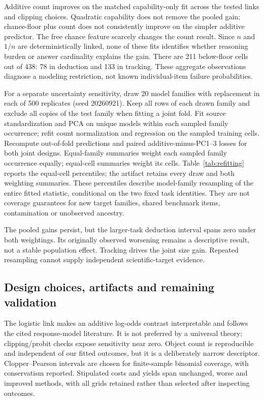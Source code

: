Additive count improves on the matched capability-only fit across the tested links and clipping choices. Quadratic capability does not remove the pooled gain; chance-floor plus count does not consistently improve on the simpler additive predictor. The free chance feature scarcely changes the count result. Since $n$ and $1/n$ are deterministically linked, none of these fits identifies whether reasoning burden or answer cardinality explains the gain. There are 211 below-floor cells out of 438: 78 in deduction and 133 in tracking. These aggregate observations diagnose a modeling restriction, not known individual-item failure probabilities.

For a separate uncertainty sensitivity, draw 20 model families with replacement in each of 500 replicates (seed 20260921). Keep all rows of each drawn family and exclude all copies of the test family when fitting a joint fold. Fit source standardization and PCA on unique models within each sampled family occurrence; refit count normalization and regression on the sampled training cells. Recompute out-of-fold predictions and paired additive-minus-PC1--3 losses for both joint designs. Equal-family summaries weight each sampled family occurrence equally; equal-cell summaries weight its cells. Table~\ref{tab:refitting} reports the equal-cell percentiles; the artifact retains every draw and both weighting summaries. These percentiles describe model-family resampling of the entire fitted statistic, conditional on the two fixed task identities. They are not coverage guarantees for new target families, shared benchmark items, contamination or unobserved ancestry.

\begin{table}[htbp]\centering\small
\caption{Full-pipeline cluster-refit percentiles of additive-count minus capability-only rate-MSE; negative favors count. These differ from the earlier fixed-prediction intervals for count interactions.}
\label{tab:refitting}

\end{table}

The pooled gains persist, but the larger-task deduction interval spans zero under both weightings. Its originally observed worsening remains a descriptive result, not a stable population effect. Tracking drives the joint size gain. Repeated resampling cannot supply independent scientific-target evidence.

\subsection{Design choices, artifacts and remaining validation}
The logistic link makes an additive log-odds contrast interpretable and follows the cited response-model literature. It is not preferred by a universal theory; clipping/probit checks expose sensitivity near zero. Object count is reproducible and independent of our fitted outcomes, but it is a deliberately narrow descriptor. Clopper--Pearson intervals are chosen for finite-sample binomial coverage, with conservatism reported. Stipulated costs and yields span unchanged, worse and improved methods, with all grids retained rather than selected after inspecting outcomes.

